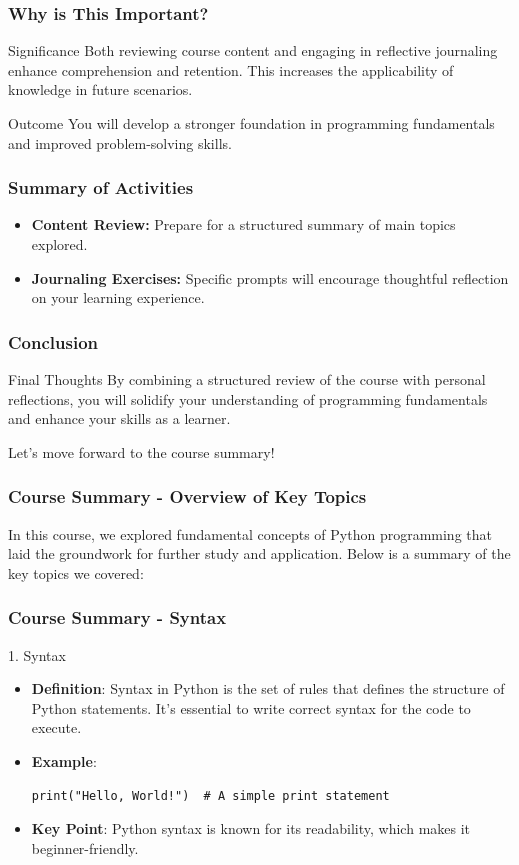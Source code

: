 \documentclass{beamer}
\begin{document}
\begin{frame}[fragile]
    \frametitle{Why is This Important?}
    \begin{block}{Significance}
        Both reviewing course content and engaging in reflective journaling enhance comprehension and retention. This increases the applicability of knowledge in future scenarios. 
    \end{block}
    \begin{block}{Outcome}
        You will develop a stronger foundation in programming fundamentals and improved problem-solving skills.
    \end{block}
\end{frame}

\begin{frame}[fragile]
    \frametitle{Summary of Activities}
    \begin{itemize}
        \item \textbf{Content Review:} Prepare for a structured summary of main topics explored.
        \item \textbf{Journaling Exercises:} Specific prompts will encourage thoughtful reflection on your learning experience.
    \end{itemize}
\end{frame}

\begin{frame}[fragile]
    \frametitle{Conclusion}
    \begin{block}{Final Thoughts}
        By combining a structured review of the course with personal reflections, you will solidify your understanding of programming fundamentals and enhance your skills as a learner.
    \end{block}
    Let's move forward to the course summary!
\end{frame}

\begin{frame}[fragile]
    \frametitle{Course Summary - Overview of Key Topics}
    In this course, we explored fundamental concepts of Python programming that laid the groundwork for further study and application. Below is a summary of the key topics we covered:
\end{frame}

\begin{frame}[fragile]
    \frametitle{Course Summary - Syntax}
    \begin{block}{1. Syntax}
        \begin{itemize}
            \item \textbf{Definition}: Syntax in Python is the set of rules that defines the structure of Python statements. It's essential to write correct syntax for the code to execute.
            \item \textbf{Example}:
            \begin{lstlisting}
print("Hello, World!")  # A simple print statement
            \end{lstlisting}
            \item \textbf{Key Point}: Python syntax is known for its readability, which makes it beginner-friendly.
        \end{itemize}
    \end{block}
\end{frame}
\end{document}
